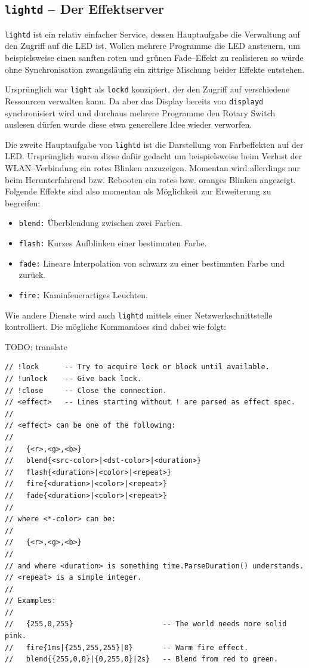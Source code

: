 \documentclass[11pt,ngerman,toc=listof,index=totoc]{scrreprt}
\providecommand{\tightlist}{%
  \setlength{\itemsep}{0pt}\setlength{\parskip}{0pt}}
\begin{document}
\subsection{\texorpdfstring{\texttt{lightd} -- Der
Effektserver}{lightd -- Der Effektserver}}\label{lightd-der-effektserver}

\texttt{lightd} ist ein relativ einfacher Service, dessen Hauptaufgabe
die Verwaltung auf den Zugriff auf die LED ist. Wollen mehrere Programme
die LED ansteuern, um beispielsweise einen sanften roten und grünen
Fade--Effekt zu realisieren so würde ohne Synchronisation zwangsläufig
ein zittrige Mischung beider Effekte entstehen.

Ursprünglich war \texttt{light} als \texttt{lockd} konzipiert, der den
Zugriff auf verschiedene Ressourcen verwalten kann. Da aber das Display
bereits von \texttt{displayd} synchronisiert wird und durchaus mehrere
Programme den Rotary Switch auslesen dürfen wurde diese etwa generellere
Idee wieder verworfen.

Die zweite Hauptaufgabe von \texttt{lightd} ist die Darstellung von
Farbeffekten auf der LED. Ursprünglich waren diese dafür gedacht um
beispielsweise beim Verlust der WLAN--Verbindung ein rotes Blinken
anzuzeigen. Momentan wird allerdings nur beim Herunterfahrend bzw.
Rebooten ein rotes bzw. oranges Blinken angezeigt. Folgende Effekte sind
also momentan als Möglichkeit zur Erweiterung zu begreifen:

\begin{itemize}
\tightlist
\item
  \texttt{blend:} Überblendung zwischen zwei Farben.
\item
  \texttt{flash:} Kurzes Aufblinken einer bestimmten Farbe.
\item
  \texttt{fade:} Lineare Interpolation von schwarz zu einer bestimmten
  Farbe und zurück.
\item
  \texttt{fire:} Kaminfeuerartiges Leuchten.
\end{itemize}

Wie andere Dienste wird auch \texttt{lightd} mittels einer
Netzwerkschnittstelle kontrolliert. Die mögliche Kommandoes sind dabei
wie folgt:

TODO: translate

\begin{verbatim}
// !lock      -- Try to acquire lock or block until available.
// !unlock    -- Give back lock.
// !close     -- Close the connection.
// <effect>   -- Lines starting without ! are parsed as effect spec.
//
// <effect> can be one of the following:
//
//   {<r>,<g>,<b>}
//   blend{<src-color>|<dst-color>|<duration>}
//   flash{<duration>|<color>|<repeat>}
//   fire{<duration>|<color>|<repeat>}
//   fade{<duration>|<color>|<repeat>}
//
// where <*-color> can be:
//
//   {<r>,<g>,<b>}
//
// and where <duration> is something time.ParseDuration() understands.
// <repeat> is a simple integer.
//
// Examples:
//
//   {255,0,255}                     -- The world needs more solid pink.
//   fire{1ms|{255,255,255}|0}       -- Warm fire effect.
//   blend{{255,0,0}|{0,255,0}|2s}   -- Blend from red to green.
\end{verbatim}
\end{document}
